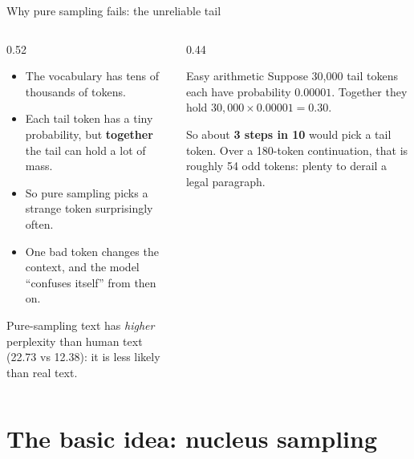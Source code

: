 \documentclass[aspectratio=169,11pt]{beamer}
\begin{document}
\begin{frame}{Why pure sampling fails: the unreliable tail}
  \begin{columns}[T]
    \begin{column}{0.52\textwidth}
      \small
      \begin{itemize}
        \item The vocabulary has tens of thousands of tokens.
        \item Each tail token has a tiny probability, but \textbf{together} the tail can hold a lot of mass.
        \item So pure sampling picks a strange token surprisingly often.
        \item One bad token changes the context, and the model ``confuses itself'' from then on.
      \end{itemize}
      Pure-sampling text has \emph{higher} perplexity than human text (22.73 vs 12.38): it is less likely than real text.
    \end{column}
    \begin{column}{0.44\textwidth}
      \begin{exampleblock}{Easy arithmetic}
        \small
        Suppose 30,000 tail tokens each have probability $0.00001$.
        Together they hold $30{,}000\times0.00001=0.30$.
        \vspace{1mm}

        So about \textbf{3 steps in 10} would pick a tail token. Over a 180-token continuation, that is roughly 54 odd tokens: plenty to derail a legal paragraph.
      \end{exampleblock}
    \end{column}
  \end{columns}
\end{frame}

\section{The basic idea: nucleus sampling}
\end{document}
